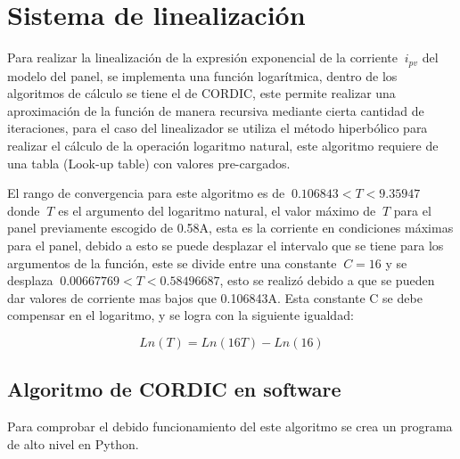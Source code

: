 \chapter{Sistema de linealización}
\label{ch:linealizacion}

Para realizar la linealización de la expresión exponencial de la corriente $\ i_{pv} $ del modelo del panel, se implementa una función logarítmica, dentro de los algoritmos de cálculo se tiene el de CORDIC, este permite realizar una aproximación de la función de manera recursiva mediante cierta cantidad de iteraciones, para el caso del linealizador se utiliza el método hiperbólico para realizar el cálculo de la operación logaritmo natural, este algoritmo requiere de una tabla (Look-up table) con valores pre-cargados. 

El rango de convergencia para este algoritmo es de $\ 0.106843 < T < 9.35947 $ donde $\ T $ es el argumento del logaritmo natural, el valor máximo de $\ T $ para el panel previamente escogido de 0.58A, esta es la corriente en condiciones máximas para el panel, debido a esto se puede desplazar el intervalo que se tiene para los argumentos de la función, este se divide entre una constante $\ C = 16$ y se desplaza $\ 0.00667769 < T < 0.58496687 $, esto se realizó debido a que se pueden dar valores de corriente mas bajos que 0.106843A. Esta constante C se debe compensar en el logaritmo, y se logra con la siguiente igualdad: 

\begin{equation} \label{eq:ej1}
  Ln \left( T \right)
  = Ln \left( 16T \right) - Ln\left( 16 \right) 
\end{equation}  

  

\section{Algoritmo de CORDIC en software}
 
Para comprobar el debido funcionamiento del este algoritmo se crea un programa de alto nivel en Python.  


